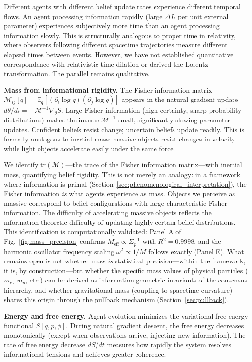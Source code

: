 \documentclass[11pt]{article}
\begin{document}
Different agents with different belief update rates experience different temporal flows. An agent processing information rapidly (large $\Delta I_i$ per unit external parameter) experiences subjectively more time than an agent processing information slowly. This is structurally analogous to proper time in relativity, where observers following different spacetime trajectories measure different elapsed times between events. However, we have not established quantitative correspondence with relativistic time dilation or derived the Lorentz transformation. The parallel remains qualitative.

\textbf{Mass from informational rigidity.} The Fisher information matrix $\mathcal{M}_{ij}[q] = \mathbb{E}_{q}[(\partial_i \log q)(\partial_j \log q)]$ appears in the natural gradient update $d\theta/dt = -\mathcal{M}^{-1} \nabla_\theta S$. Large Fisher information (high certainty, sharp probability distributions) makes the inverse $\mathcal{M}^{-1}$ small, significantly slowing parameter updates. Confident beliefs resist change; uncertain beliefs update readily. This is formally analogous to inertial mass: massive objects resist changes in velocity while light objects accelerate easily under the same force.

We identify $\mathrm{tr}(\mathcal{M})$---the trace of the Fisher information matrix---with inertial mass, quantifying belief rigidity. This is not merely an analogy: in a framework where information is primal (Section~\ref{sec:phenomenological_interpretation}), the Fisher information \emph{is} what agents experience as mass. Objects we perceive as massive correspond to belief configurations with large characteristic Fisher information. The difficulty of accelerating massive objects reflects the information-theoretic difficulty of updating highly certain belief distributions. This identification is computationally validated: Panel A of Fig.~\ref{fig:mass_precision} confirms $M_{\mathrm{eff}} \propto \Sigma_p^{-1}$ with $R^2 = 0.9998$, and the harmonic oscillator frequency scaling $\omega^2 \propto 1/M$ follows exactly (Panel E). What remains open is not whether mass \emph{is} statistical precision---within the framework, it is, by construction---but whether the specific mass values of physical particles ($m_e$, $m_p$, etc.) can be derived as information-geometric invariants of the consensus hierarchy, and whether gravitational mass (coupling to spacetime curvature) shares this origin through the pullback mechanism (Section~\ref{sec:pullback}).

\textbf{Energy and free energy.} Agent evolution minimizes the variational free energy functional $S[q, p, \phi]$. During natural gradient descent, the free energy decreases monotonically (except when observations arrive, injecting new information). The rate of free energy decrease $dS/dt$ measures how rapidly the system resolves informational tensions and achieves greater coherence.
\end{document}
